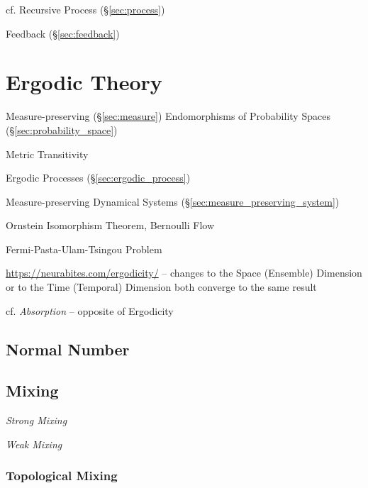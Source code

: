 \fist cf. Recursive Process (\S\ref{sec:process})

Feedback (\S\ref{sec:feedback})



\section{Ergodic Theory}\label{sec:ergodic_theory}

Measure-preserving (\S\ref{sec:measure}) Endomorphisms of Probability Spaces
(\S\ref{sec:probability_space})

Metric Transitivity

\fist Ergodic Processes (\S\ref{sec:ergodic_process})

\fist Measure-preserving Dynamical Systems
(\S\ref{sec:measure_preserving_system})

Ornstein Isomorphism Theorem, Bernoulli Flow

Fermi-Pasta-Ulam-Tsingou Problem

\url{https://neurabites.com/ergodicity/} -- changes to the Space (Ensemble)
Dimension or to the Time (Temporal) Dimension both converge to the same result

cf. \emph{Absorption} -- opposite of Ergodicity



\subsection{Normal Number}\label{sec:normal_number}

\subsection{Mixing}\label{sec:mixing}

\emph{Strong Mixing}

\emph{Weak Mixing}



\subsubsection{Topological Mixing}\label{sec:topological_mixing}



